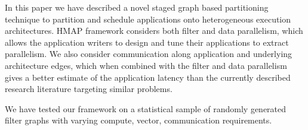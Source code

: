 \documentclass[10pt, conference, compsocconf]{IEEEtran}
\begin{document}
In this paper we have described a novel staged graph based partitioning
technique to partition and schedule applications onto heterogeneous
execution architectures. HMAP framework considers both filter and data
parallelism, which allows the application writers to design and tune their
applications to extract parallelism. We also consider communication along
application and underlying architecture edges, which when combined with the
filter and data parallelism gives a better estimate of the application latency
than the currently described research literature targeting similar problems.

We have tested our framework on a statistical sample of randomly
generated filter graphs with varying compute, vector, communication
requirements.




\end{document}
